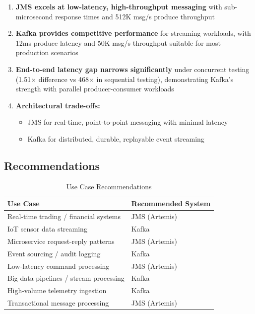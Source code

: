 \documentclass[11pt,a4paper]{article}
\begin{document}
\begin{enumerate}[leftmargin=*,nosep]
    \item \textbf{JMS excels at low-latency, high-throughput messaging} with
          sub-microsecond response times and 512K msg/s produce throughput
    
    \item \textbf{Kafka provides competitive performance} for streaming workloads,
          with 12ms produce latency and 50K msg/s throughput suitable for most
          production scenarios
    
    \item \textbf{End-to-end latency gap narrows significantly} under concurrent
          testing (1.51$\times$ difference vs 468$\times$ in sequential testing),
          demonstrating Kafka's strength with parallel producer-consumer workloads
    
    \item \textbf{Architectural trade-offs:}
          \begin{itemize}
              \item JMS for real-time, point-to-point messaging with minimal latency
              \item Kafka for distributed, durable, replayable event streaming
          \end{itemize}
\end{enumerate}

\subsection{Recommendations}

\begin{table}[H]
\centering
\caption{Use Case Recommendations}
\begin{tabular}{@{}p{4.5cm}p{8cm}@{}}
\toprule
\textbf{Use Case} & \textbf{Recommended System} \\
\midrule
Real-time trading / financial systems & JMS (Artemis) \\
IoT sensor data streaming & Kafka \\
Microservice request-reply patterns & JMS (Artemis) \\
Event sourcing / audit logging & Kafka \\
Low-latency command processing & JMS (Artemis) \\
Big data pipelines / stream processing & Kafka \\
High-volume telemetry ingestion & Kafka \\
Transactional message processing & JMS (Artemis) \\
\bottomrule
\end{tabular}
\end{table}
\end{document}
